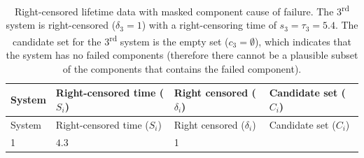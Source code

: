 \documentclass[
]{article}
\begin{document}
\begin{longtable}[]{@{}llll@{}}
\caption{Right-censored lifetime data with masked component cause of
failure. The \(3\)\textsuperscript{rd} system is right-censored
(\(\delta_3 = 1\)) with a right-censoring time of
\(s_3 = \tau_3 = 5.4\). The candidate set for the
\(3\)\textsuperscript{rd} system is the empty set (\(c_3 = \emptyset\)),
which indicates that the system has no failed components (therefore
there cannot be a plausible subset of the components that contains the
failed component).}\tabularnewline
\toprule
\begin{minipage}[b]{0.07\columnwidth}\raggedright
System\strut
\end{minipage} & \begin{minipage}[b]{0.30\columnwidth}\raggedright
Right-censored time (\(S_i\))\strut
\end{minipage} & \begin{minipage}[b]{0.30\columnwidth}\raggedright
Right censored (\(\delta_i\))\strut
\end{minipage} & \begin{minipage}[b]{0.23\columnwidth}\raggedright
Candidate set (\(C_i\))\strut
\end{minipage}\tabularnewline
\midrule
\endfirsthead
\toprule
\begin{minipage}[b]{0.07\columnwidth}\raggedright
System\strut
\end{minipage} & \begin{minipage}[b]{0.30\columnwidth}\raggedright
Right-censored time (\(S_i\))\strut
\end{minipage} & \begin{minipage}[b]{0.30\columnwidth}\raggedright
Right censored (\(\delta_i\))\strut
\end{minipage} & \begin{minipage}[b]{0.23\columnwidth}\raggedright
Candidate set (\(C_i\))\strut
\end{minipage}\tabularnewline
\midrule
\endhead
\begin{minipage}[t]{0.07\columnwidth}\raggedright
1\strut
\end{minipage} & \begin{minipage}[t]{0.30\columnwidth}\raggedright
\(4.3\)\strut
\end{minipage} & \begin{minipage}[t]{0.30\columnwidth}\raggedright
1\strut
\end{minipage} & \begin{minipage}[t]{0.23\columnwidth}\raggedright

\end{minipage}
\end{longtable}
\end{document}
